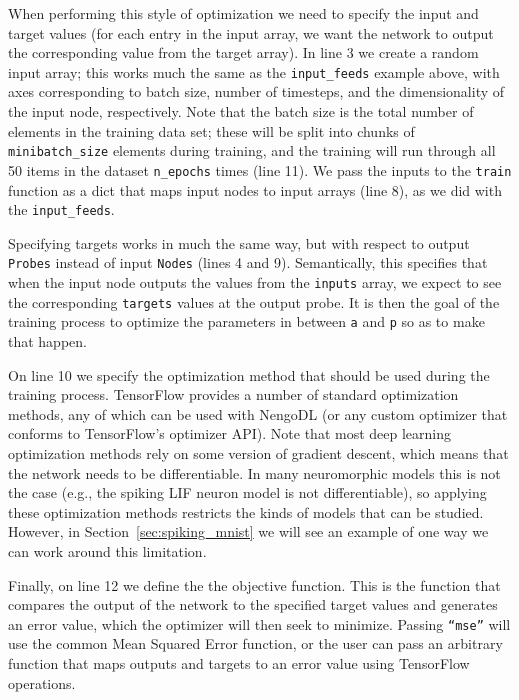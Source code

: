 \documentclass{article}
\begin{document}
\lstset{numbers=left}


When performing this style of optimization we need to specify the input and target values (for each entry in the input array, we want the network to output the corresponding value from the target array).  In line 3 we create a random input array; this works much the same as the \texttt{input\_feeds} example above, with axes corresponding to batch size, number of timesteps, and the dimensionality of the input node, respectively.  Note that the batch size is the total number of elements in the training data set; these will be split into chunks of \texttt{minibatch\_size} elements during training, and the training will run through all 50 items in the dataset \texttt{n\_epochs} times (line 11).  We pass the inputs to the \texttt{train} function as a dict that maps input nodes to input arrays (line 8), as we did with the \texttt{input\_feeds}.

Specifying targets works in much the same way, but with respect to output \texttt{Probes} instead of input \texttt{Nodes} (lines 4 and 9).  Semantically, this specifies that when the input node outputs the values from the \texttt{inputs} array, we expect to see the corresponding \texttt{targets} values at the output probe.  It is then the goal of the training process to optimize the parameters in between \texttt{a} and \texttt{p} so as to make that happen.

On line 10 we specify the optimization method that should be used during the training process.  TensorFlow provides a number of standard optimization methods, any of which can be used with NengoDL (or any custom optimizer that conforms to TensorFlow's optimizer API).  Note that most deep learning optimization methods rely on some version of gradient descent, which means that the network needs to be differentiable.  In many neuromorphic models this is not the case (e.g., the spiking LIF neuron model is not differentiable), so applying these optimization methods restricts the kinds of models that can be studied.  However, in Section~\ref{sec:spiking_mnist} we will see an example of one way we can work around this limitation.

Finally, on line 12 we define the the objective function.  This is the function that compares the output of the network to the specified target values and generates an error value, which the optimizer will then seek to minimize.  Passing \texttt{``mse''} will use the common Mean Squared Error function, or the user can pass an arbitrary function that maps outputs and targets to an error value using TensorFlow operations.
\end{document}
